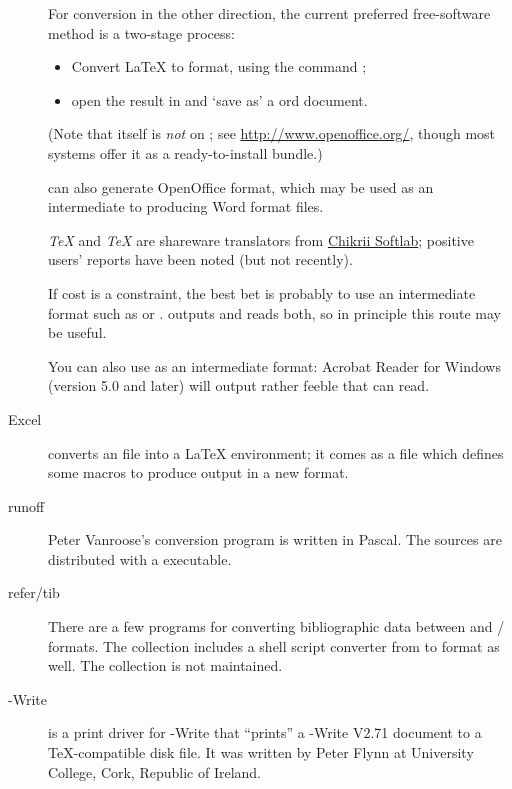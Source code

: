 \begin{description}
  For conversion in the other direction, the current preferred
  free-software method is a two-stage process:
  \begin{itemize}
  \item Convert \LaTeX{} to  format, using the
     command ;
  \item open the result in  and `save as' a
    ord document.
  \end{itemize}
  (Note that  itself is \emph{not} on
  ; see \url{http://www.openoffice.org/}, though most
   systems offer it as a ready-to-install bundle.)

   can also generate OpenOffice 
  format, which may be used as an intermediate to producing Word
  format files.

  \emph{\TeX{}} and \emph{\TeX{}} are 
  shareware translators from %
  \href{http://www.chikrii.com/}{Chikrii Softlab}; positive users'
  reports have been noted (but not recently).

  If cost is a constraint, the best bet is probably to use an
  intermediate format such as  or .
   outputs and reads both, so in principle this route
  may be useful.

  You can also use  as an intermediate format: Acrobat Reader
  for Windows (version 5.0 and later) will output rather feeble
   that  can read.
\item[Excel]  converts an  file
  into a \LaTeX{}  environment; it comes as a
   file which defines some  macros to produce
  output in a new format.
\item[runoff] Peter Vanroose's 
  conversion program is written in  Pascal.
  The sources are distributed with a  executable.
\item[refer/tib] There are a few programs for converting bibliographic
  data between \BibTeX{} and / formats.
  The collection includes a shell script converter from \BibTeX{} to
   format as well. The collection
  is not maintained.
\item[\acro{PC}-Write] is a
  print driver for -Write that ``prints'' a -Write
  V2.71 document to a \TeX{}-compatible disk file.  It was written by Peter
  Flynn at University College, Cork, Republic of Ireland.
\end{description}

